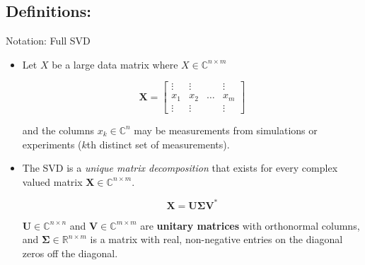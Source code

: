 \documentclass[9pt]{beamer}
\begin{document}
\subsection{Definitions:}
\begin{frame}{Notation: Full SVD}
    \begin{itemize}
        \item Let $X$ be a large data matrix where $X  \in \mathbb{C}^{n\times m}$
        
        \begin{equation}
            \mathbf{X} = 
            \begin{bmatrix}
                    \vdots & \vdots & & \vdots\\
                    x_{1} & x_{2} & \hdots & x_{m}\\
                    \vdots & \vdots & & \vdots
            \end{bmatrix}
        \end{equation}
        
        and the columns $x_{k} \in \mathbb{C}^{n}$ may be measurements from simulations or experiments ($k$th distinct set of measurements).
        
        \item The SVD is a \textit{unique matrix decomposition} that exists for every complex valued matrix $\mathbf{X} \in \mathbb{C}^{n \times m}$.
        
        \begin{equation}
            \mathbf{X} = \mathbf{U\Sigma V}^{*}
        \end{equation}
        
        $\mathbf{U} \in \mathbb{C}^{n \times n}$ and $\mathbf{V} \in \mathbb{C}^{m \times m}$ are \textbf{unitary matrices} with orthonormal columns, and $\mathbf{\Sigma} \in \mathbb{R}^{n \times m}$ is a matrix with real, non-negative entries on the diagonal zeros off the diagonal.\footnotemark
        
    \end{itemize}
\end{frame}

\end{document}
